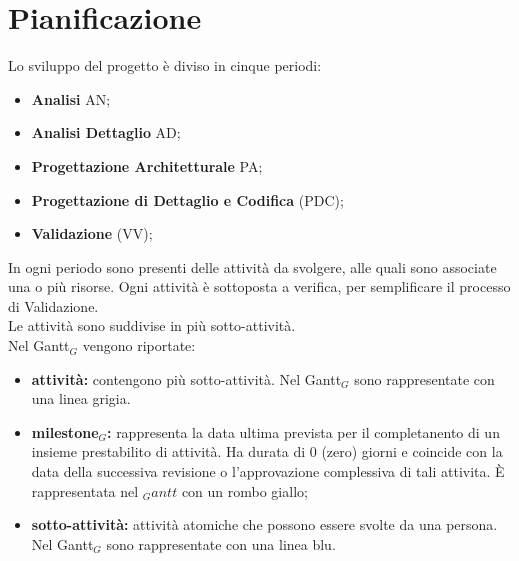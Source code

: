 \chapter{Pianificazione}
Lo sviluppo del progetto è diviso in cinque periodi:
\begin{itemize}
    \item \textbf{Analisi} AN;
    \item \textbf{Analisi Dettaglio} AD;
    \item \textbf{Progettazione Architetturale} PA;
    \item \textbf{Progettazione di Dettaglio e Codifica} (PDC);
    \item \textbf{Validazione} (VV);
\end{itemize}
In ogni periodo sono presenti delle attività da svolgere, alle quali sono associate una o più risorse. Ogni attività è sottoposta a verifica, per semplificare il processo di Validazione.\\
Le attività sono suddivise in più sotto-attività.\\
Nel Gantt$_{G}$ vengono riportate:
\begin{itemize}
    \item \textbf{attività:} contengono più sotto-attività. Nel Gantt$_{G}$ sono rappresentate con una linea grigia.
    \item \textbf{milestone$_{G}$:} rappresenta la data ultima prevista per il completanento di un insieme prestabilito di attività. Ha durata di 0 (zero) giorni e coincide con la data della successiva revisione o l'approvazione complessiva di tali attivita. È rappresentata nel $_Gantt$ con un rombo giallo;
    \item \textbf{sotto-attività:} attività atomiche che possono essere svolte da una persona. Nel Gantt$_{G}$ sono rappresentate con una linea blu.  
\end{itemize}
